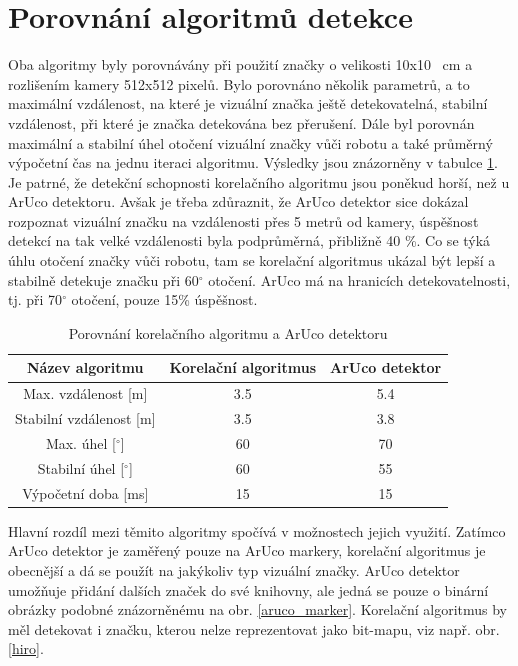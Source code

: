 \documentclass[twoside]{ctuthesis}
\theoremstyle{plain}
\theoremstyle{definition}
\theoremstyle{note}
\begin{document}
\section{Porovnání algoritmů detekce}

Oba algoritmy byly porovnávány při použití značky o velikosti 10x10 \SI{}{cm} a rozlišením kamery 512x512 pixelů. Bylo porovnáno několik parametrů, a to maximální vzdálenost, na které je vizuální značka ještě detekovatelná, stabilní vzdálenost, při které je značka detekována bez přerušení. Dále byl porovnán maximální a stabilní úhel otočení vizuální značky vůči robotu a také průměrný výpočetní čas na jednu iteraci algoritmu. Výsledky jsou znázorněny v tabulce \ref{porovnani}. Je patrné, že detekční schopnosti korelačního algoritmu jsou poněkud horší, než u ArUco detektoru. Avšak je třeba zdůraznit, že ArUco detektor sice dokázal rozpoznat vizuální značku na vzdálenosti přes 5 metrů od kamery, úspěšnost detekcí na tak velké vzdálenosti byla podprůměrná, přibližně 40 \%. Co se týká úhlu otočení značky vůči robotu, tam se korelační algoritmus ukázal být lepší a stabilně detekuje značku při 60$^\circ$ otočení. ArUco má na hranicích detekovatelnosti, tj. při 70$^\circ$ otočení, pouze 15\% úspěšnost.

\begin{table}[hbt]
	\centering
	\caption{Porovnání korelačního algoritmu a ArUco detektoru}
	\label{porovnani}
	\begin{tabular}{|c|c|c|}
		\hline
		Název algoritmu              & Korelační algoritmus & ArUco detektor \\ \hline
		Max. vzdálenost {[}m{]}      & 3.5                 & 5.4           \\ \hline
		Stabilní vzdálenost {[}m{]}  & 3.5                 & 3.8           \\ \hline
		Max. úhel {[}$^\circ${]}     & 60                   & 70             \\ \hline
		Stabilní úhel {[}$^\circ${]} & 60                   & 55             \\ \hline
		Výpočetní doba {[}ms{]}      & 15                   & 15             \\ \hline
	\end{tabular}
\end{table}
Hlavní rozdíl mezi těmito algoritmy spočívá v možnostech jejich využití. Zatímco ArUco detektor je zaměřený pouze na ArUco markery, korelační algoritmus je obecnější a dá se použít na jakýkoliv typ vizuální značky. ArUco detektor umožňuje přidání dalších značek do své knihovny, ale jedná se pouze o binární obrázky podobné znázorněnému na obr. \ref{aruco_marker}. Korelační algoritmus by měl detekovat i značku, kterou nelze reprezentovat jako bit-mapu, viz např. obr. \ref{hiro}.
\end{document}
